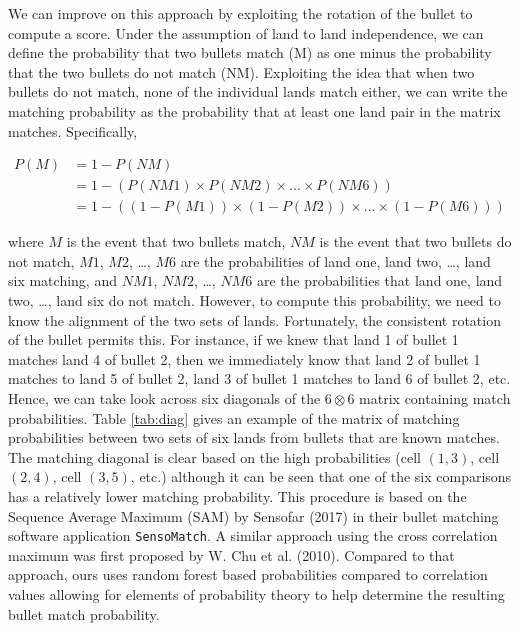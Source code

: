 \documentclass[12pt,]{article}
\theoremstyle{definition}
\theoremstyle{definition}
\theoremstyle{definition}
\theoremstyle{remark}
\begin{document}
We can improve on this approach by exploiting the rotation of the bullet
to compute a score. Under the assumption of land to land independence,
we can define the probability that two bullets match (M) as one minus
the probability that the two bullets do not match (NM). Exploiting the
idea that when two bullets do not match, none of the individual lands
match either, we can write the matching probability as the probability
that at least one land pair in the matrix matches. Specifically,

\begin{align*}
P(M) &= 1 - P(NM) \\
     &= 1 - (P(NM1) \times P(NM2) \times ... \times P(NM6)) \\
     &= 1 - ((1 - P(M1)) \times (1 - P(M2)) \times ... \times (1 - P(M6)))
\end{align*}

where \(M\) is the event that two bullets match, \(NM\) is the event
that two bullets do not match, \(M1\), \(M2\), \ldots{}, \(M6\) are the
probabilities of land one, land two, \ldots{}, land six matching, and
\(NM1\), \(NM2\), \ldots{}, \(NM6\) are the probabilities that land one,
land two, \ldots{}, land six do not match. However, to compute this
probability, we need to know the alignment of the two sets of lands.
Fortunately, the consistent rotation of the bullet permits this. For
instance, if we knew that land 1 of bullet 1 matches land 4 of bullet 2,
then we immediately know that land 2 of bullet 1 matches to land 5 of
bullet 2, land 3 of bullet 1 matches to land 6 of bullet 2, etc. Hence,
we can take look across six diagonals of the \(6 \otimes 6\) matrix
containing match probabilities. Table \ref{tab:diag} gives an example of
the matrix of matching probabilities between two sets of six lands from
bullets that are known matches. The matching diagonal is clear based on
the high probabilities (cell \((1, 3)\), cell \((2, 4)\), cell
\((3, 5)\), etc.) although it can be seen that one of the six
comparisons has a relatively lower matching probability. This procedure
is based on the Sequence Average Maximum (SAM) by Sensofar (2017) in
their bullet matching software application \texttt{SensoMatch}. A
similar approach using the cross correlation maximum was first proposed
by W. Chu et al. (2010). Compared to that approach, ours uses random
forest based probabilities compared to correlation values allowing for
elements of probability theory to help determine the resulting bullet
match probability.
\end{document}
